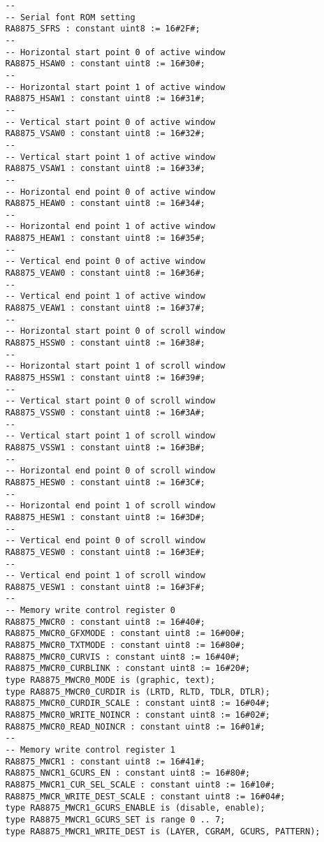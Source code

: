 \documentclass[10pt, openany]{book}
\begin{document}
\begin{lstlisting}
   --
   -- Serial font ROM setting
   RA8875_SFRS : constant uint8 := 16#2F#;
   --
   -- Horizontal start point 0 of active window
   RA8875_HSAW0 : constant uint8 := 16#30#;
   --
   -- Horizontal start point 1 of active window
   RA8875_HSAW1 : constant uint8 := 16#31#;
   --
   -- Vertical start point 0 of active window
   RA8875_VSAW0 : constant uint8 := 16#32#;
   --
   -- Vertical start point 1 of active window
   RA8875_VSAW1 : constant uint8 := 16#33#;
   --
   -- Horizontal end point 0 of active window
   RA8875_HEAW0 : constant uint8 := 16#34#;
   --
   -- Horizontal end point 1 of active window
   RA8875_HEAW1 : constant uint8 := 16#35#;
   --
   -- Vertical end point 0 of active window
   RA8875_VEAW0 : constant uint8 := 16#36#;
   --
   -- Vertical end point 1 of active window
   RA8875_VEAW1 : constant uint8 := 16#37#;
   --
   -- Horizontal start point 0 of scroll window
   RA8875_HSSW0 : constant uint8 := 16#38#;
   --
   -- Horizontal start point 1 of scroll window
   RA8875_HSSW1 : constant uint8 := 16#39#;
   --
   -- Vertical start point 0 of scroll window
   RA8875_VSSW0 : constant uint8 := 16#3A#;
   --
   -- Vertical start point 1 of scroll window
   RA8875_VSSW1 : constant uint8 := 16#3B#;
   --
   -- Horizontal end point 0 of scroll window
   RA8875_HESW0 : constant uint8 := 16#3C#;
   --
   -- Horizontal end point 1 of scroll window
   RA8875_HESW1 : constant uint8 := 16#3D#;
   --
   -- Vertical end point 0 of scroll window
   RA8875_VESW0 : constant uint8 := 16#3E#;
   --
   -- Vertical end point 1 of scroll window
   RA8875_VESW1 : constant uint8 := 16#3F#;
   --
   -- Memory write control register 0
   RA8875_MWCR0 : constant uint8 := 16#40#;
   RA8875_MWCR0_GFXMODE : constant uint8 := 16#00#;
   RA8875_MWCR0_TXTMODE : constant uint8 := 16#80#;
   RA8875_MWCR0_CURVIS : constant uint8 := 16#40#;
   RA8875_MWCR0_CURBLINK : constant uint8 := 16#20#;
   type RA8875_MWCR0_MODE is (graphic, text);
   type RA8875_MWCR0_CURDIR is (LRTD, RLTD, TDLR, DTLR);
   RA8875_MWCR0_CURDIR_SCALE : constant uint8 := 16#04#;
   RA8875_MWCR0_WRITE_NOINCR : constant uint8 := 16#02#;
   RA8875_MWCR0_READ_NOINCR : constant uint8 := 16#01#;
   --
   -- Memory write control register 1
   RA8875_MWCR1 : constant uint8 := 16#41#;
   RA8875_NWCR1_GCURS_EN : constant uint8 := 16#80#;
   RA8875_MWCR1_CUR_SEL_SCALE : constant uint8 := 16#10#;
   RA8875_MWCR_WRITE_DEST_SCALE : constant uint8 := 16#04#;
   type RA8875_MWCR1_GCURS_ENABLE is (disable, enable);
   type RA8875_MWCR1_GCURS_SET is range 0 .. 7;
   type RA8875_MWCR1_WRITE_DEST is (LAYER, CGRAM, GCURS, PATTERN);

\end{lstlisting}
\end{document}
